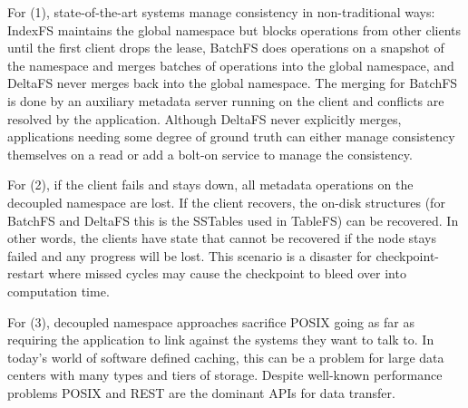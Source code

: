 For (1), state-of-the-art systems manage consistency in non-traditional ways:
IndexFS maintains the global namespace but blocks operations from other clients
until the first client drops the lease, BatchFS does operations on a snapshot
of the namespace and merges batches of operations into the global namespace,
and DeltaFS never merges back into the global namespace. The merging for
BatchFS is done by an auxiliary metadata server running on the client and
conflicts are resolved by the application. Although DeltaFS never explicitly
merges, applications needing some degree of ground truth can either manage
consistency themselves on a read or add a bolt-on service to manage the
consistency.

For (2), if the client fails and stays down, all metadata operations on the
decoupled namespace are lost. If the client recovers, the on-disk structures
(for BatchFS and DeltaFS this is the SSTables used in TableFS) can be
recovered. In other words, the clients have state that cannot be recovered if
the node stays failed and any progress will be lost. This scenario is a
disaster for checkpoint-restart where missed cycles may cause the checkpoint to
bleed over into computation time.

For (3), decoupled namespace approaches sacrifice POSIX going as far as
requiring the application to link against the systems they want to talk to. In
today's world of software defined caching, this can be a problem for large data
centers with many types and tiers of storage. Despite well-known performance
problems POSIX and REST are the dominant APIs for data transfer.
